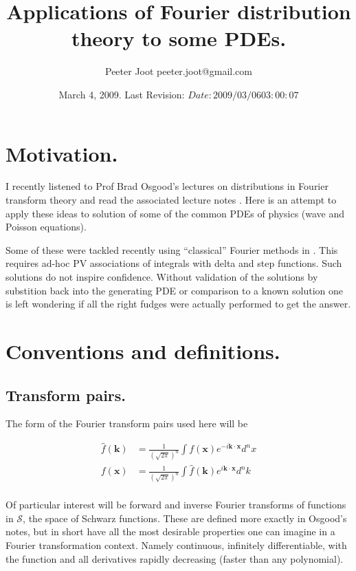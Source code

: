 \documentclass{article}
\title{ Applications of Fourier distribution theory to some PDEs. }
\author{Peeter Joot \quad peeter.joot@gmail.com }
\date{ March 4, 2009.  Last Revision: $Date: 2009/03/06 03:00:07 $ }
\newcommand{\Sw}[0]{\mathcal{S}}
\begin{document}
\maketitle{}
\tableofcontents

\section{ Motivation. }

I recently listened to Prof Brad Osgood's lectures on distributions in Fourier
transform theory and read the associated lecture notes
\cite{osgoodFourier}.  Here is an attempt to apply these ideas to solution
of some of the common PDEs of physics (wave and Poisson equations).

Some of these were tackled recently using ``classical'' Fourier methods
in \cite{PJpoisson}. 
This requires ad-hoc PV associations of integrals with delta and step
functions.  Such solutions do not inspire confidence.  Without
validation of the solutions by substition back into the generating PDE
or comparison to a known solution one is left wondering
if all the right fudges were actually performed to get the answer.

\section{ Conventions and definitions. }

\subsection{ Transform pairs. }

The form of the Fourier transform pairs used here will be

\begin{align*}
\hat{f}(\mathbf{k}) &= \frac{1}{(\sqrt{2\pi})^n} \int f(\mathbf{x}) e^{-i \mathbf{k} \cdot \mathbf{x} } d^n x \\
{f}(\mathbf{x}) &= \frac{1}{(\sqrt{2\pi})^n} \int \hat{f}(\mathbf{k}) e^{i \mathbf{k} \cdot \mathbf{x} } d^n k \\
\end{align*}

Of particular interest will be forward and inverse Fourier transforms
of functions in $\Sw$, the space of Schwarz functions.  These are defined
more exactly in Osgood's notes, but in short have all the most desirable
properties one can imagine in a Fourier transformation context.  Namely
continuous, infinitely differentiable, with the function and all 
derivatives rapidly decreasing (faster than any polynomial).
\end{document}
